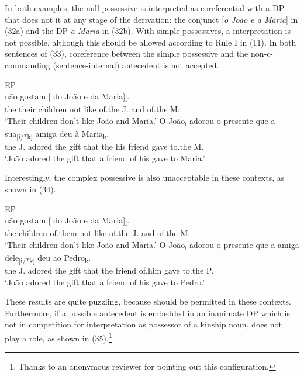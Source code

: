 \documentclass[output=paper]{langsci/langscibook}
\begin{document}
In both examples, the null possessive is interpreted as coreferential with a DP that does not  it at any stage of the derivation: the conjunct [\textit{o João e a Maria}] in (32a) and the DP \textit{a Maria} in (32b). With simple possessives, a  interpretation is not possible, although this should be allowed according to Rule I in (11). In both sentences of (33), coreference between the simple possessive and the non-c-commanding (sentence-internal) antecedent is not accepted.

\ea%
         EP\label{ex:wein:33}\\
    \ea  
    \gll {} não gostam [ do João e da Maria]\textsubscript{i}.\\
         {} the their children not like {} of.the J. and of.the M.\\
    \glt ‘Their children don’t like João and Maria.’
    \ex  
    \gll O João\textsubscript{i} adorou o presente que a sua\textsubscript{[i/*k]} amiga deu à Maria\textsubscript{k}.\\
         the J. adored the gift that the his friend gave to.the M.\\
    \glt ‘João adored the gift that a friend of his gave to Maria.’
    \z
\z

Interestingly, the complex possessive is also unacceptable in these contexts, as shown in (34).

\ea%
         EP\label{ex:wein:34}\\
    \ea  
    \gll {} não gostam [ do João e da Maria]\textsubscript{i}.\\
         {} the children of.them not like {} of.the J. and of.the M.\\
    \glt ‘Their children don’t like João and Maria.’
    \ex  
    \gll O João\textsubscript{i} adorou o presente que a amiga dele\textsubscript{[i/*k]} deu ao Pedro\textsubscript{k}.\\
         the J. adored the gift that the friend of.him gave to.the P.\\
    \glt ‘João adored the gift that a friend of his gave to Pedro.’
    \z
\z

These results are quite puzzling, because  should be permitted in these contexts. Furthermore, if a possible antecedent is embedded in an inanimate DP which is not in competition for interpretation as possessor of a kinship noun,  does not play a role, as shown in (35).\footnote{Thanks to an anonymous reviewer for pointing out this configuration.}
\end{document}
